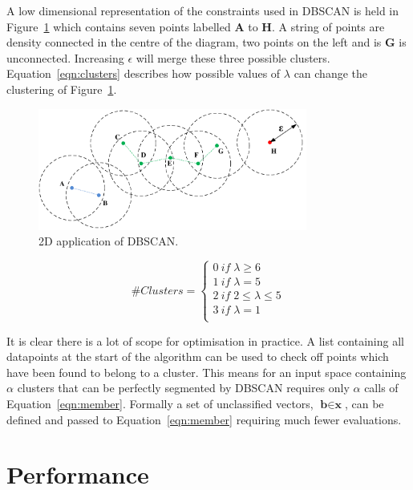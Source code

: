 \documentclass{ecsarticle}     %
\begin{document}
A low dimensional representation of the constraints used in DBSCAN is held in Figure~\ref{fig:circles} which contains seven points labelled \textbf{A} to \textbf{H}.
A string of points are density connected in the centre of the diagram, two points on the left and is \textbf{G} is unconnected.
Increasing $\epsilon$ will merge these three possible clusters.
Equation~\eqref{eqn:clusters} describes how possible values of $\lambda$ can change the clustering of Figure~\ref{fig:circles}.


\begin{figure}[ht]
   \centering
    \includegraphics[height = 4cm]{circles.pdf}
   \caption{2D application of DBSCAN.}
   \label{fig:circles}
\end{figure}

\begin{equation}
	\# Clusters = \left\{
		\begin{array}{l}
    		0\:if\; \lambda \geq 6\\
    		1\:if\; \lambda = 5 \\
			2\:if\; 2 \leq \lambda \leq 5 \\
			3\:if\; \lambda = 1\\
  		\end{array} \right.
	\label{eqn:clusters}
\end{equation}




It is clear there is a lot of scope for optimisation in practice.
A list containing all datapoints at the start of the algorithm can be used to check off points which have been found to belong to a cluster.
This means for an input space containing $\alpha$ clusters that can be perfectly segmented by DBSCAN requires only $\alpha$ calls of Equation~\eqref{eqn:member}.
Formally a set of unclassified vectors, $\textbf{b} \in \textbf{x}$, can be defined and passed to Equation~\eqref{eqn:member} requiring much fewer evaluations. 


\section{Performance}
\end{document}
